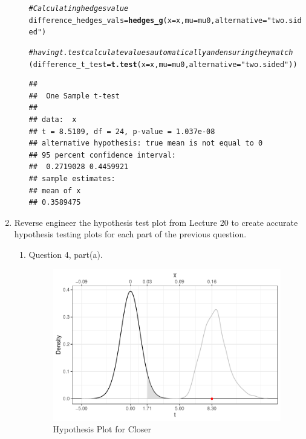 \documentclass{article}\usepackage[]{graphicx}\usepackage[]{xcolor}
\makeatletter
\newcommand{\hlsng}[1]{\textcolor[rgb]{0.192,0.494,0.8}{#1}}%
\newcommand{\hlcom}[1]{\textcolor[rgb]{0.678,0.584,0.686}{\textit{#1}}}%
\newcommand{\hldef}[1]{\textcolor[rgb]{0.345,0.345,0.345}{#1}}%
\newcommand{\hlkwb}[1]{\textcolor[rgb]{0.69,0.353,0.396}{#1}}%
\newcommand{\hlkwc}[1]{\textcolor[rgb]{0.333,0.667,0.333}{#1}}%
\newcommand{\hlkwd}[1]{\textcolor[rgb]{0.737,0.353,0.396}{\textbf{#1}}}%
\newenvironment{kframe}{%
 \def\at@end@of@kframe{}%
 \ifinner\ifhmode%
  \def\at@end@of@kframe{\end{minipage}}%
  \begin{minipage}{\columnwidth}%
 \fi\fi%
 \def\FrameCommand##1{\hskip\@totalleftmargin \hskip-\fboxsep
 \colorbox{shadecolor}{##1}\hskip-\fboxsep
     \hskip-\linewidth \hskip-\@totalleftmargin \hskip\columnwidth}%
 \MakeFramed {\advance\hsize-\width
   \@totalleftmargin\z@ \linewidth\hsize
   \@setminipage}}%
 {\par\unskip\endMakeFramed%
 \at@end@of@kframe}
\newenvironment{knitrout}{}{} %
\makeatother
\begin{document}
\begin{enumerate}
\begin{enumerate}
\begin{knitrout}
\begin{kframe}
\begin{alltt}
\hlcom{#Calculating hedges value}
\hldef{difference_hedges_vals} \hlkwb{=} \hlkwd{hedges_g}\hldef{(}\hlkwc{x} \hldef{= x,} \hlkwc{mu} \hldef{= mu0,} \hlkwc{alternative} \hldef{=} \hlsng{"two.sided"}\hldef{)}

\hlcom{#having t.test calculate values automatically and ensuring they match}
\hldef{(difference_t_test} \hlkwb{=} \hlkwd{t.test}\hldef{(}\hlkwc{x}\hldef{=x,} \hlkwc{mu} \hldef{= mu0,} \hlkwc{alternative} \hldef{=} \hlsng{"two.sided"}\hldef{))}
\end{alltt}
\begin{verbatim}
## 
## 	One Sample t-test
## 
## data:  x
## t = 8.5109, df = 24, p-value = 1.037e-08
## alternative hypothesis: true mean is not equal to 0
## 95 percent confidence interval:
##  0.2719028 0.4459921
## sample estimates:
## mean of x 
## 0.3589475
\end{verbatim}
\end{kframe}
\end{knitrout}
\end{enumerate}
\item Reverse engineer the hypothesis test plot from Lecture 20 to create accurate
hypothesis testing plots for each part of the previous question.
\begin{enumerate}
  \item Question 4, part(a).
  
\begin{figure}[H]
 \begin{center}
 \includegraphics[scale=0.65]{closer_plot.pdf}
 \caption{Hypothesis Plot for Closer}
 \label{plot2}
 \end{center}
 \end{figure}
  

\end{enumerate}
\end{enumerate}
\end{document}
